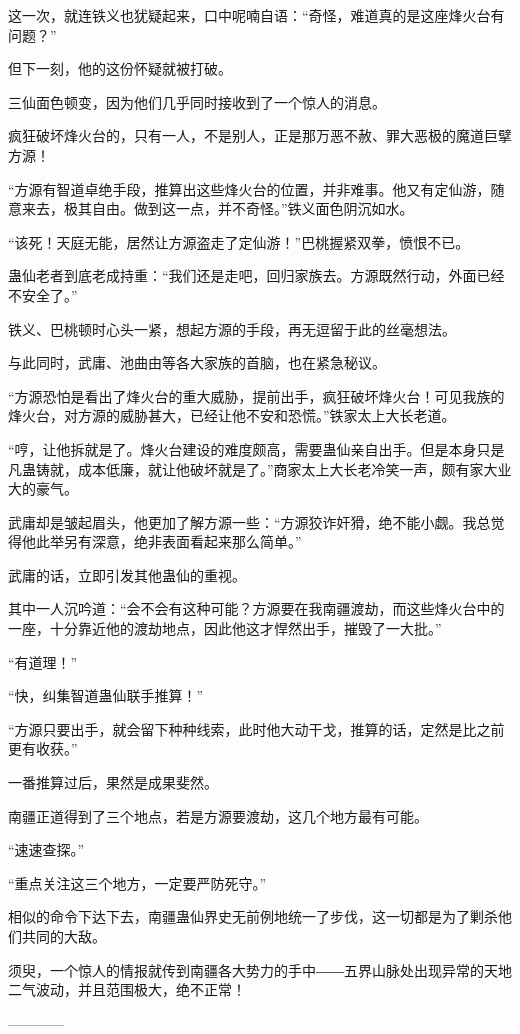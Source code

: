 \begin{this_body}
这一次，就连铁义也犹疑起来，口中呢喃自语：“奇怪，难道真的是这座烽火台有问题？”

但下一刻，他的这份怀疑就被打破。

三仙面色顿变，因为他们几乎同时接收到了一个惊人的消息。

疯狂破坏烽火台的，只有一人，不是别人，正是那万恶不赦、罪大恶极的魔道巨擘方源！

“方源有智道卓绝手段，推算出这些烽火台的位置，并非难事。他又有定仙游，随意来去，极其自由。做到这一点，并不奇怪。”铁义面色阴沉如水。

“该死！天庭无能，居然让方源盗走了定仙游！”巴桃握紧双拳，愤恨不已。

蛊仙老者到底老成持重：“我们还是走吧，回归家族去。方源既然行动，外面已经不安全了。”

铁义、巴桃顿时心头一紧，想起方源的手段，再无逗留于此的丝毫想法。

与此同时，武庸、池曲由等各大家族的首脑，也在紧急秘议。

“方源恐怕是看出了烽火台的重大威胁，提前出手，疯狂破坏烽火台！可见我族的烽火台，对方源的威胁甚大，已经让他不安和恐慌。”铁家太上大长老道。

“哼，让他拆就是了。烽火台建设的难度颇高，需要蛊仙亲自出手。但是本身只是凡蛊铸就，成本低廉，就让他破坏就是了。”商家太上大长老冷笑一声，颇有家大业大的豪气。

武庸却是皱起眉头，他更加了解方源一些：“方源狡诈奸猾，绝不能小觑。我总觉得他此举另有深意，绝非表面看起来那么简单。”

武庸的话，立即引发其他蛊仙的重视。

其中一人沉吟道：“会不会有这种可能？方源要在我南疆渡劫，而这些烽火台中的一座，十分靠近他的渡劫地点，因此他这才悍然出手，摧毁了一大批。”

“有道理！”

“快，纠集智道蛊仙联手推算！”

“方源只要出手，就会留下种种线索，此时他大动干戈，推算的话，定然是比之前更有收获。”

一番推算过后，果然是成果斐然。

南疆正道得到了三个地点，若是方源要渡劫，这几个地方最有可能。

“速速查探。”

“重点关注这三个地方，一定要严防死守。”

相似的命令下达下去，南疆蛊仙界史无前例地统一了步伐，这一切都是为了剿杀他们共同的大敌。

须臾，一个惊人的情报就传到南疆各大势力的手中――五界山脉处出现异常的天地二气波动，并且范围极大，绝不正常！

------------

\end{this_body}

